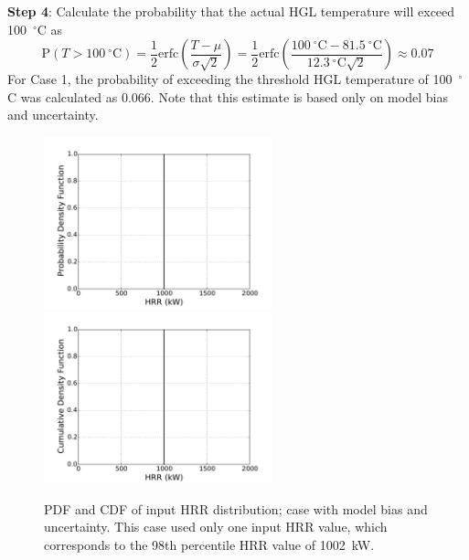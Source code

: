 \documentclass[12pt]{article}
\begin{document}
\textbf{Step 4}: Calculate the probability that the actual HGL temperature will exceed 100~$^\circ$C as
\begin{equation}
\textrm{P}(T > 100~^\circ\textrm{C}) = \frac{1}{2} \textrm{erfc} \left( \frac{T - \mu}{\sigma \sqrt{2}} \right) = \frac{1}{2} \textrm{erfc} \left( \frac{100~^\circ\textrm{C} - 81.5~^\circ\textrm{C}}{12.3~^\circ\textrm{C} \sqrt{2}} \right) \approx 0.07
\end{equation}
For Case 1, the probability of exceeding the threshold HGL temperature of 100~$^\circ$C was calculated as 0.066. Note that this estimate is based only on model bias and uncertainty.


\clearpage


\begin{figure}[p]
\includegraphics[width=2.6in]{Figures/input_PDF_point}
\includegraphics[width=2.6in]{Figures/input_CDF_point}
\caption{PDF and CDF of input HRR distribution; case with model bias and uncertainty. This case used only one input HRR value, which corresponds to the 98th percentile HRR value of 1002~kW.}
\label{fig:case_1_input_distributions}
\end{figure}
\end{document}
